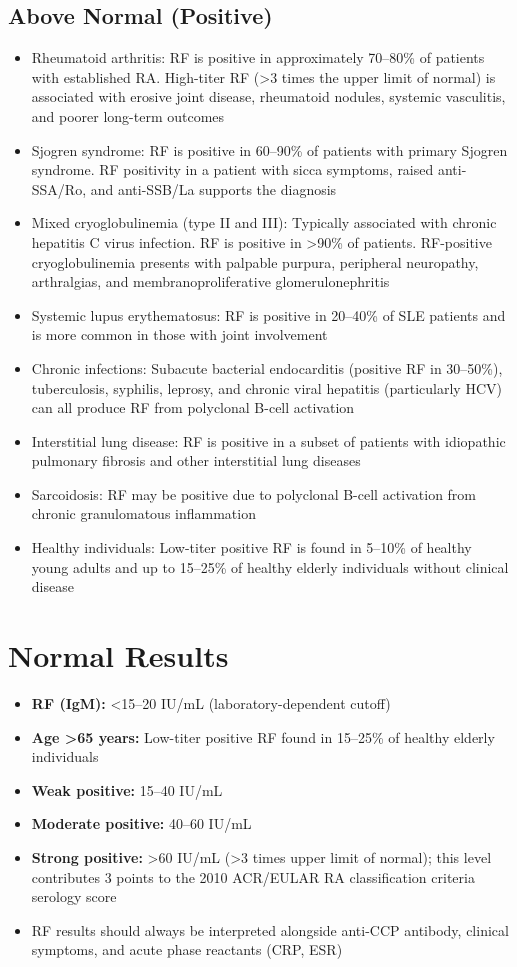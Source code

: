 \subsection*{Above Normal (Positive)}
\begin{itemize}
  \item Rheumatoid arthritis: RF is positive in approximately 70--80\% of patients with established RA. High-titer RF (>3 times the upper limit of normal) is associated with erosive joint disease, rheumatoid nodules, systemic vasculitis, and poorer long-term outcomes
  \item Sjogren syndrome: RF is positive in 60--90\% of patients with primary Sjogren syndrome. RF positivity in a patient with sicca symptoms, raised anti-SSA/Ro, and anti-SSB/La supports the diagnosis
  \item Mixed cryoglobulinemia (type II and III): Typically associated with chronic hepatitis C virus infection. RF is positive in >90\% of patients. RF-positive cryoglobulinemia presents with palpable purpura, peripheral neuropathy, arthralgias, and membranoproliferative glomerulonephritis
  \item Systemic lupus erythematosus: RF is positive in 20--40\% of SLE patients and is more common in those with joint involvement
  \item Chronic infections: Subacute bacterial endocarditis (positive RF in 30--50\%), tuberculosis, syphilis, leprosy, and chronic viral hepatitis (particularly HCV) can all produce RF from polyclonal B-cell activation
  \item Interstitial lung disease: RF is positive in a subset of patients with idiopathic pulmonary fibrosis and other interstitial lung diseases
  \item Sarcoidosis: RF may be positive due to polyclonal B-cell activation from chronic granulomatous inflammation
  \item Healthy individuals: Low-titer positive RF is found in 5--10\% of healthy young adults and up to 15--25\% of healthy elderly individuals without clinical disease
\end{itemize}

\section*{Normal Results}
\begin{itemize}
  \item \textbf{RF (IgM):} <15--20 IU/mL (laboratory-dependent cutoff)
  \item \textbf{Age >65 years:} Low-titer positive RF found in 15--25\% of healthy elderly individuals
  \item \textbf{Weak positive:} 15--40 IU/mL
  \item \textbf{Moderate positive:} 40--60 IU/mL
  \item \textbf{Strong positive:} >60 IU/mL (>3 times upper limit of normal); this level contributes 3 points to the 2010 ACR/EULAR RA classification criteria serology score
  \item RF results should always be interpreted alongside anti-CCP antibody, clinical symptoms, and acute phase reactants (CRP, ESR)
\end{itemize}

